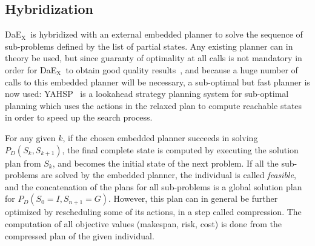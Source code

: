 \documentclass{llncs}
\def\DAEX{{\sc DaE$_{\text{X}}$}}
\begin{document}
\subsection{Hybridization}
\DAEX\ is hybridized with an external embedded planner to solve the sequence of sub-problems defined by the list of partial states.
Any existing planner can in theory be used, but since guaranty of optimality at all calls is not mandatory in order for \DAEX\ to obtain good quality results~\cite{Bibai2010}, and because a huge number of calls to this embedded planner will be necessary, a sub-optimal but fast planner is now used: YAHSP~\cite{Vidal2004} is a lookahead 
strategy planning system for sub-optimal planning which uses the  actions in the relaxed plan to compute reachable states in order to speed up the search process.

For any given $k$, if the chosen embedded planner succeeds in solving $ P_{D} (S_k, S_{k+1} )$, the final complete state is computed by executing the solution plan
from $S_k$, and becomes the initial state of the next problem. If all the sub-problems are solved by the  embedded planner, 
the individual is called \textit{feasible}, and the concatenation of the plans for all sub-problems  is a
global solution plan for $P_{D} (S_{0} = I, S_{n+1} = G)$. However, this plan can in general be further optimized by rescheduling some of its actions, in a step called
compression. The computation of all objective values (makespan, risk, cost) is done from the compressed plan of the given individual.
\end{document}
